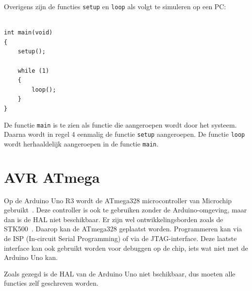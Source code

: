 Overigens zijn de functies \lstinline|setup| en \lstinline|loop| als volgt te simuleren op een PC:

\begin{lstlisting}[caption=Simulatie van de functies \texttt{setup} en \texttt{loop}.]

int main(void)
{
    setup();

    while (1)
    {
        loop();
    }
}
\end{lstlisting}

De functie \lstinline|main| is te zien als functie die aangeroepen wordt door het systeem. Daarna wordt in regel 4 eenmalig de functie \lstinline|setup| aangeroepen. De functie \lstinline|loop| wordt herhaaldelijk aangeroepen in de functie \lstinline|main|.

\section{AVR ATmega}
Op de Arduino Uno R3 wordt de ATmega328 microcontroller van Microchip gebruikt~\cite{atmega328p}. Deze controller is ook te gebruiken zonder de Arduino-omgeving, maar dan is de HAL niet beschikbaar. Er zijn wel ontwikkelingsborden zoals de STK500~\cite{stk500}. Daarop kan de ATmega328 geplaatst worden. Programmeren kan via de ISP (In-circuit Serial Programming) of via de JTAG-interface. Deze laatste interface kan ook gebruikt worden voor debuggen op de chip, iets wat niet met de Arduino Uno kan.

Zoals gezegd is de HAL van de Arduino Uno niet bschikbaar, dus moeten alle functies zelf geschreven worden.